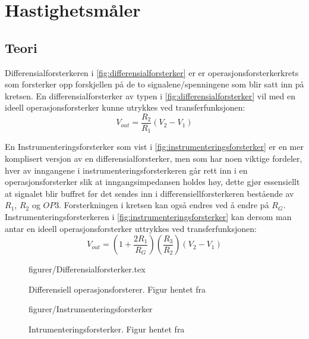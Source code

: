



\section{Hastighetsmåler}
\subsection{Teori}
Differensialforsterkeren i \autoref{fig:differensialforsterker} er er operasjonsforsterkerkrets som forsterker opp forskjellen på de to signalene/spenningene som blir satt inn på kretsen. En differensialforsterker av typen i \autoref{fig:differensialforsterker} vil med en ideell operasjonsforsterker kunne utrykkes ved transferfunksjonen\cite{Johnson}:
\begin{equation}
    V_{out} = \frac{R_2}{R_1}(V_2-V_1)
    \label{eq:differensialforsterker}
\end{equation}

En Instrumenteringsforsterker som vist i \autoref{fig:instrumenteringsforsterker} er en mer komplisert versjon av en differensialforsterker, men som har noen viktige fordeler, hver av inngangene i instrumenteringsforsterkeren går rett inn i en operasjonsforsterker slik at inngangsimpedansen holdes høy, dette gjør essensiellt at signalet blir buffret før det sendes inn i differensiellforsterkeren bestående av $R_1$, $R_2$ og $OP3$. Forsterkningen i kretsen kan også endres ved å endre på $R_G$. Instrumenteringsforsterkeren i \autoref{fig:instrumenteringsforsterker} kan dersom man antar en ideell operasjonsforsterker uttrykkes ved transferfunksjonen:
\begin{equation}
    V_{out} = (1+\frac{2R_1}{R_G})(\frac{R_3}{R_2})(V_2-V_1)
    \label{eq:instrumenteringsforsterker}
\end{equation}


\begin{figure} [h]
     {figurer/Differensialforsterker.tex}
    \caption{Differensiell operasjonsforsterer. Figur hentet fra \cite{Johnson}}
    \label{fig:differensialforsterker}
\end{figure}


\begin{figure} [h]
    \centering
     {figurer/Instrumenteringsforsterker}
    \caption{Intrumenteringsforsterker. Figur hentet fra \cite{Johnson}}
    \label{fig:instrumenteringsforsterker}
\end{figure}



